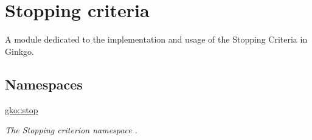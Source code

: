 \hypertarget{group__stop}{}\section{Stopping criteria}
\label{group__stop}


A module dedicated to the implementation and usage of the Stopping Criteria in Ginkgo.  


\subsection*{Namespaces}
\begin{DoxyCompactItemize}
\item 
 \hyperlink{namespacegko_1_1stop}{gko\+::stop}
\begin{DoxyCompactList}\small\item\em The Stopping criterion namespace . \end{DoxyCompactList}\end{DoxyCompactItemize}

